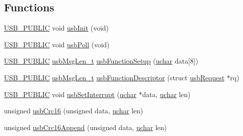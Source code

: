 \subsection*{Functions}
\begin{DoxyCompactItemize}
\item 
\hyperlink{mhvlib-_vusb-_console_2vusb_2usbdrv_8h_a5f6aa87267678dc37dd5d97a7b3df7c3}{U\-S\-B\-\_\-\-P\-U\-B\-L\-I\-C} void \hyperlink{mhvlib-_vusb-_keyboard_2vusb_2usbdrv_8h_a5672a0c07f0f8e93bde4579d278e6307}{usb\-Init} (void)
\item 
\hyperlink{mhvlib-_vusb-_console_2vusb_2usbdrv_8h_a5f6aa87267678dc37dd5d97a7b3df7c3}{U\-S\-B\-\_\-\-P\-U\-B\-L\-I\-C} void \hyperlink{mhvlib-_vusb-_keyboard_2vusb_2usbdrv_8h_a188162c29eb62ffbd2d33763d20e12b4}{usb\-Poll} (void)
\item 
\hyperlink{mhvlib-_vusb-_console_2vusb_2usbdrv_8h_a5f6aa87267678dc37dd5d97a7b3df7c3}{U\-S\-B\-\_\-\-P\-U\-B\-L\-I\-C} \hyperlink{mhvlib-_vusb-_console_2vusb_2usbdrv_8h_a57df3bf9fc8ec8cd9b29ba8dfc361059}{usb\-Msg\-Len\-\_\-t} \hyperlink{mhvlib-_vusb-_keyboard_2vusb_2usbdrv_8h_a990d35fe479b1ee8abd7c169626b51f6}{usb\-Function\-Setup} (\hyperlink{mhvlib-_vusb-_console_2vusb_2usbdrv_8h_aa8ddf20cdd716b652e76e23e5e700893}{uchar} data\mbox{[}8\mbox{]})
\item 
\hyperlink{mhvlib-_vusb-_console_2vusb_2usbdrv_8h_a5f6aa87267678dc37dd5d97a7b3df7c3}{U\-S\-B\-\_\-\-P\-U\-B\-L\-I\-C} \hyperlink{mhvlib-_vusb-_console_2vusb_2usbdrv_8h_a57df3bf9fc8ec8cd9b29ba8dfc361059}{usb\-Msg\-Len\-\_\-t} \hyperlink{mhvlib-_vusb-_keyboard_2vusb_2usbdrv_8h_a36e4115eff7bf97a7132f6308f923b2b}{usb\-Function\-Descriptor} (struct \hyperlink{structusb_request}{usb\-Request} $\ast$rq)
\item 
\hyperlink{mhvlib-_vusb-_console_2vusb_2usbdrv_8h_a5f6aa87267678dc37dd5d97a7b3df7c3}{U\-S\-B\-\_\-\-P\-U\-B\-L\-I\-C} void \hyperlink{mhvlib-_vusb-_keyboard_2vusb_2usbdrv_8h_aafa474a799eed02d362bfdfb8a36602c}{usb\-Set\-Interrupt} (\hyperlink{mhvlib-_vusb-_console_2vusb_2usbdrv_8h_aa8ddf20cdd716b652e76e23e5e700893}{uchar} $\ast$data, \hyperlink{mhvlib-_vusb-_console_2vusb_2usbdrv_8h_aa8ddf20cdd716b652e76e23e5e700893}{uchar} len)
\item 
unsigned \hyperlink{mhvlib-_vusb-_keyboard_2vusb_2usbdrv_8h_a504d52f57f31b4e78beb03f706a542e3}{usb\-Crc16} (unsigned data, \hyperlink{mhvlib-_vusb-_console_2vusb_2usbdrv_8h_aa8ddf20cdd716b652e76e23e5e700893}{uchar} len)
\item 
unsigned \hyperlink{mhvlib-_vusb-_keyboard_2vusb_2usbdrv_8h_a19659c3a47ead1ffaa62d50237390f12}{usb\-Crc16\-Append} (unsigned data, \hyperlink{mhvlib-_vusb-_console_2vusb_2usbdrv_8h_aa8ddf20cdd716b652e76e23e5e700893}{uchar} len)
\end{DoxyCompactItemize}
